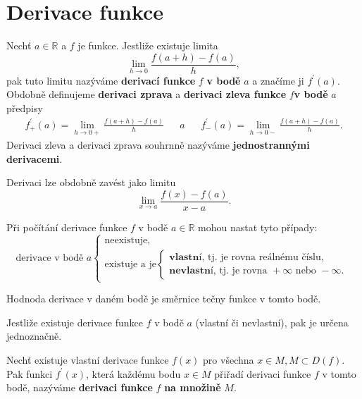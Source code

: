 \section{Derivace funkce}
\begin{definition}\label{derivace}
Nechť $a \in \mathbb R$ a $f$ je funkce. Jestliže existuje limita
$$\lim_{h\to 0} \frac{f(a+h)-f(a)}{h},$$
pak tuto limitu nazýváme \textbf{derivací funkce} $f$ \textbf{v bodě} $a$ a značíme ji $f^\prime (a).$
Obdobně definujeme \textbf{derivaci zprava} a \textbf{derivaci zleva funkce} $f$\textbf{v bodě}
$a$ předpisy
\begin{align*}
    f_+^\prime(a) = \lim_{h\to 0+} \frac{f(a+h)-f(a)}{h} & & a & & f_-^\prime(a) = \lim_{h\to 0-} \frac{f(a+h)-f(a)}{h}.
\end{align*}
Derivaci zleva a derivaci zprava souhrnně nazýváme \textbf{jednostrannými derivacemi}.
\end{definition}

\begin{pozn}
    Derivaci lze obdobně zavést jako limitu
    $$\lim_{x\to a} \frac{f(x)-f(a)}{x-a}.$$
\end{pozn}

\begin{pozn}
     Při počítání derivace funkce $f$ v bodě $a\in \mathbb R$ mohou nastat
     tyto případy:
     $$
     \textrm{derivace v bodě } a \begin{cases}
        \textrm{neexistuje,} \\
        \textrm{existuje a je} \begin{cases}
            \textbf{vlastní}\textrm{, tj. je rovna reálnému číslu}, \\
            \textbf{nevlastní}\textrm{, tj. je rovna } +\infty \textrm{ nebo } - \infty.
        \end{cases}
     \end{cases}
     $$
\end{pozn}

\begin{pozn}
    Hodnoda derivace v daném bodě je směrnice tečny funkce v tomto bodě.
\end{pozn}

\begin{veta}
    Jestliže existuje derivace funkce $f$ v bodě $a$ (vlastní či nevlastní),
    pak je určena jednoznačně.
\end{veta}

\begin{definition}
Nechť existuje vlastní derivace funkce $f(x)$ pro všechna $x\in M, M\subset D(f).$
Pak funkci $f^\prime(x)$, která každému bodu $x\in M$ přiřadí derivaci funkce $f$
v tomto bodě, nazýváme \textbf{derivaci funkce} $f$ \textbf{na množině} $M.$
\end{definition}

